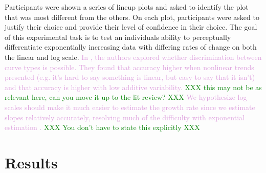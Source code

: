 \documentclass[]{interact}
\theoremstyle{plain}%
\theoremstyle{definition}
\theoremstyle{remark}
\begin{document}
Participants were shown a series of lineup plots and asked to identify
the plot that was most different from the others. On each plot,
participants were asked to justify their choice and provide their level
of confidence in their choice. The goal of this experimental task is to
test an individuals ability to perceptually differentiate exponentially
increasing data with differing rates of change on both the linear and
log scale.
\textcolor{Plum}{In \cite{best_perception_2007}, the authors explored whether discrimination between curve types is possible. 
They found that accuracy higher when nonlinear trends presented (e.g. it’s hard to say something is linear, but easy to say that it isn’t) and that accuracy is higher with low additive variability.}
\textcolor{Green}{XXX this may not be as relevant here, can you move it up to the lit review? XXX}
\textcolor{Plum}{We hypothesize log scales should make it much easier to estimate the growth rate since we estimate slopes relatively accurately, resolving much of the difficulty with exponential estimation \citep{mosteller_eye_1981}.}
\textcolor{Green}{XXX You don't have to state this explicitly XXX}

\hypertarget{results}{%
\section{Results}\label{results}}
\end{document}
